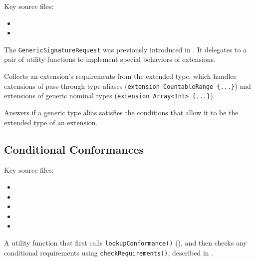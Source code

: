 \documentclass[../generics]{subfiles}
\begin{document}
Key source files:
\begin{itemize}
\item {}
\item {}
\end{itemize}
The \texttt{GenericSignatureRequest} was previously introduced in . It delegates to a pair of utility functions to implement special behaviors of extensions.

Collects an extension's requirements from the extended type, which handles extensions of pass-through type aliases (\verb|extension CountableRange {...}|) and extensions of generic nominal types (\verb|extension Array<Int> {...}|).

Answers if a generic type alias satisfies the conditions that allow it to be the extended type of an extension.

\subsection*{Conditional Conformances}

Key source files:
\begin{itemize}
\item {}
\item {}
\item {}
\item {}
\item {}
\end{itemize}

A utility function that first calls \texttt{lookupConformance()} (), and then checks any conditional requirements using \texttt{checkRequirements()}, described in .
\end{document}
